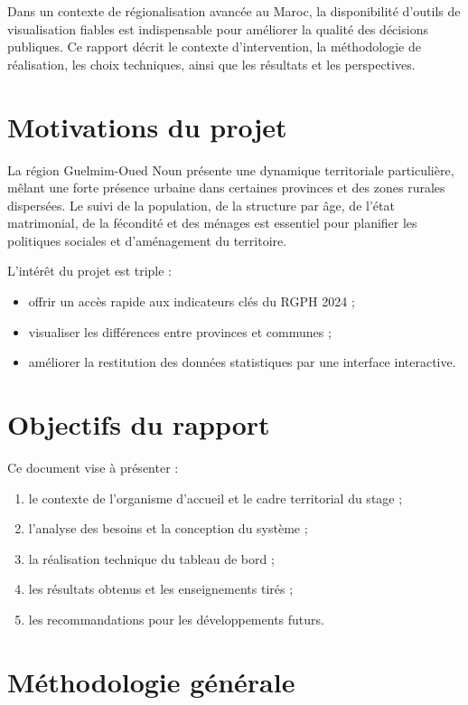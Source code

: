 \documentclass[12pt,a4paper,oneside]{report}
\begin{document}
Dans un contexte de régionalisation avancée au Maroc, la disponibilité d'outils de visualisation fiables est indispensable pour améliorer la qualité des décisions publiques. Ce rapport décrit le contexte d'intervention, la méthodologie de réalisation, les choix techniques, ainsi que les résultats et les perspectives.

\section{Motivations du projet}

La région Guelmim-Oued Noun présente une dynamique territoriale particulière, mêlant une forte présence urbaine dans certaines provinces et des zones rurales dispersées. Le suivi de la population, de la structure par âge, de l'état matrimonial, de la fécondité et des ménages est essentiel pour planifier les politiques sociales et d'aménagement du territoire.

L'intérêt du projet est triple :
\begin{itemize}[leftmargin=*]
  \item offrir un accès rapide aux indicateurs clés du RGPH 2024 ;
  \item visualiser les différences entre provinces et communes ;
  \item améliorer la restitution des données statistiques par une interface interactive.
\end{itemize}

\section{Objectifs du rapport}

Ce document vise à présenter :
\begin{enumerate}[leftmargin=*]
  \item le contexte de l'organisme d'accueil et le cadre territorial du stage ;
  \item l'analyse des besoins et la conception du système ;
  \item la réalisation technique du tableau de bord ;
  \item les résultats obtenus et les enseignements tirés ;
  \item les recommandations pour les développements futurs.
\end{enumerate}

\section{Méthodologie générale}
\end{document}
